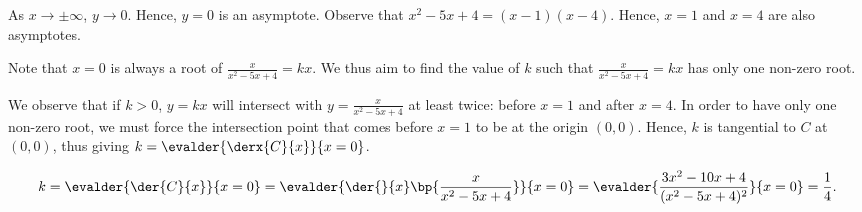 \begin{solution}
    \begin{ppart}
        As $x \to \pm \infty$, $y \to 0$. Hence, $y = 0$ is an asymptote. Observe that $x^2 - 5x + 4 = (x-1)(x-4)$. Hence, $x=1$ and $x=4$ are also asymptotes.
    \end{ppart}
    \begin{ppart}
        \begin{center}
        \end{center}
    \end{ppart}
    \begin{ppart}
        Note that $x = 0$ is always a root of $\frac{x}{x^2-5x+4} = kx$. We thus aim to find the value of $k$ such that $\frac{x}{x^2-5x+4} = kx$ has only one non-zero root. 

            We observe that if $k > 0$, $y=kx$ will intersect with $y = \frac{x}{x^2-5x+4}$ at least twice: before $x=1$ and after $x=4$. In order to have only one non-zero root, we must force the intersection point that comes before $x=1$ to be at the origin $(0, 0)$. Hence, $k$ is tangential to $C$ at $(0, 0)$, thus giving $k = \evalder{\derx{C}{x}}{x=0}$.

            \[k = \evalder{\der{C}{x}}{x=0} = \evalder{\der{}{x} \bp{\frac{x}{x^2-5x+4}}}{x=0} = \evalder{\frac{3x^2-10x+4}{(x^2-5x+4)^2}}{x=0} = \frac14.\]
    \end{ppart}
\end{solution}